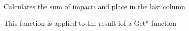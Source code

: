 \documentclass[letterpaper,10pt,english]{sphinxmanual}
\begin{document}

\begin{fulllineitems}
\label{\detokenize{attribution/modeldekom:modeldekom.AggImpact}}
\pysigstartsignatures
{}
\pysigstopsignatures
\sphinxAtStartPar
Calculates the sum of impacts and place in the last column

\sphinxAtStartPar
This function is applied to the result iof a Get* function

\end{fulllineitems}

\end{document}
